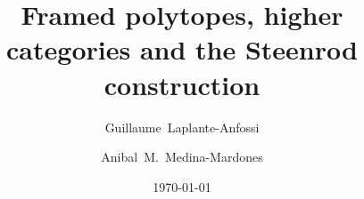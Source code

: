 \documentclass{amsart}
\title{Framed polytopes, higher categories and the Steenrod construction}
\author[G.~Laplante-Anfossi]{Guillaume~Laplante-Anfossi}
\author[A.~Medina-Mardones]{Anibal~M.~Medina-Mardones}
\date{\today}
\begin{document}
	
	\maketitle
	\tableofcontents
	
	
	
	
	
	
	
	\todos
	
	
\end{document}
